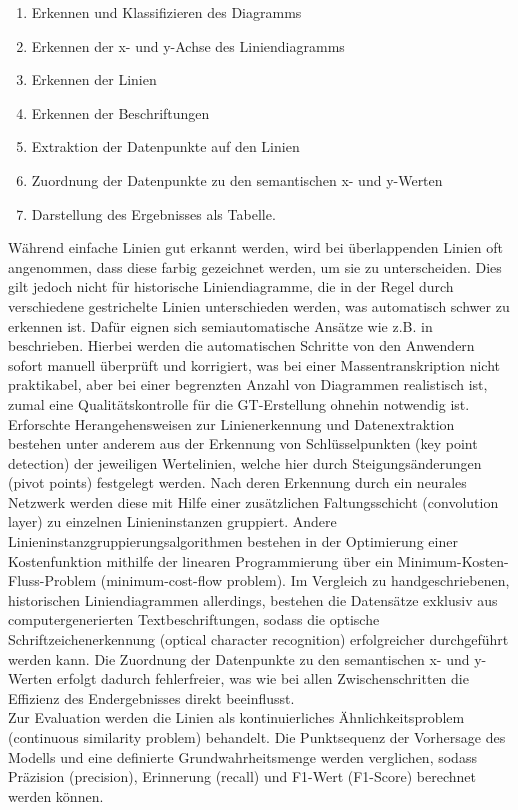 \begin{enumerate}[itemsep=0pt, topsep=0pt]
    \item Erkennen und Klassifizieren des Diagramms
    \item Erkennen der x- und y-Achse des Liniendiagramms
    \item Erkennen der Linien
    \item Erkennen der Beschriftungen
    \item Extraktion der Datenpunkte auf den Linien
    \item Zuordnung der Datenpunkte zu den semantischen x- und y-Werten
    \item Darstellung des Ergebnisses als Tabelle.
\end{enumerate}
Während einfache Linien gut erkannt werden, wird bei überlappenden Linien oft angenommen, dass diese farbig gezeichnet werden, um sie zu unterscheiden. Dies gilt jedoch nicht für historische Liniendiagramme, die in der Regel durch verschiedene gestrichelte Linien unterschieden werden, was automatisch schwer zu erkennen ist. Dafür eignen sich semiautomatische Ansätze wie z.B. in \cite{inproceedings} beschrieben. Hierbei werden die automatischen Schritte von den Anwendern sofort manuell überprüft und korrigiert, was bei einer Massentranskription nicht praktikabel, aber bei einer begrenzten Anzahl von Diagrammen realistisch ist, zumal eine Qualitätskontrolle für die GT-Erstellung ohnehin notwendig ist.
\\
Erforschte Herangehensweisen \cite{9423395} zur Linienerkennung und Datenextraktion bestehen unter anderem aus der Erkennung von Schlüsselpunkten (key point detection) der jeweiligen Wertelinien, welche hier durch Steigungsänderungen (pivot points) festgelegt werden. Nach deren Erkennung durch ein neurales Netzwerk werden diese mit Hilfe einer zusätzlichen Faltungsschicht (convolution layer) zu einzelnen Linieninstanzen gruppiert. Andere Linieninstanzgruppierungsalgorithmen \cite{parsingimages} bestehen in der Optimierung einer Kostenfunktion mithilfe der linearen Programmierung über ein Minimum-Kosten-Fluss-Problem (minimum-cost-flow problem). Im Vergleich zu handgeschriebenen, historischen Liniendiagrammen allerdings, bestehen die Datensätze exklusiv aus computergenerierten Textbeschriftungen, sodass die optische Schriftzeichenerkennung (optical character recognition) erfolgreicher durchgeführt werden kann. Die Zuordnung der Datenpunkte zu den semantischen x- und y-Werten erfolgt dadurch fehlerfreier, was wie bei allen Zwischenschritten die Effizienz des Endergebnisses direkt beeinflusst.
\\
Zur Evaluation werden die Linien als kontinuierliches Ähnlichkeitsproblem (continuous similarity problem) behandelt. Die Punktsequenz der Vorhersage des Modells und eine definierte Grundwahrheitsmenge werden verglichen, sodass Präzision (precision), Erinnerung (recall) und F1-Wert (F1-Score) berechnet werden können.
